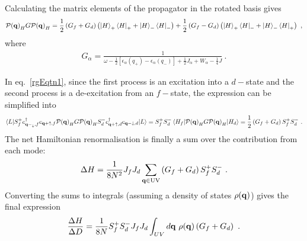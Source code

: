 \documentclass[%
reprint,
superscriptaddress,
groupedaddress,
superscriptaddress,
onecolumn,
10pt
]{revtex4-2}
\begin{document}
Calculating the matrix elements of the propagator in the rotated basis gives
\begin{equation}\begin{aligned}\label{PGP}
	\mathcal{P({\bf q})}_H G \mathcal{P({\bf q})}_H = \frac{1}{2}\left(G_f + G_d\right)\left(\ket{H}_+\bra{H}_+ + \ket{H}_-\bra{H}_-\right) + \frac{1}{2}\left(G_f - G_d\right)\left(\ket{H}_+\bra{H}_- + \ket{H}_-\bra{H}_+\right)~,
\end{aligned}\end{equation}
where
\begin{equation}\begin{aligned}
	G_\alpha = \frac{1}{\omega - \frac{1}{2}\left[\epsilon_\alpha(q_+) - \epsilon_\alpha(q_-)\right] + \frac{1}{2}J_\alpha + W_\alpha - \frac{1}{4}J}~.
\end{aligned}\end{equation}

In eq.~\ref{rgEqtn1}, since the first process is an excitation into a \(d-\)state and the second process is a de-excitation from an \(f-\)state, the expression can be simplified into
\begin{equation}\begin{aligned}\label{rgEqtn2}
	\braket{L | S_f^+ c^\dagger_{{\bf q-}_\downarrow,f}c_{{\bf q+}\uparrow,f} \mathcal{P({\bf q})}_H G \mathcal{P({\bf q})}_H S_d^- c^\dagger_{{\bf q+}\uparrow,d}c_{{\bf q-}\downarrow,d} | L } = S_f^+ S_d^- \braket{H_f | \mathcal{P({\bf q})}_H G \mathcal{P({\bf q})}_H | H_d} = \frac{1}{2}\left(G_f + G_d\right) S_f^+ S_d^-~.
\end{aligned}\end{equation}
The net Hamiltonian renormalisation is finally a sum over the contribution from each mode:
\begin{equation}\begin{aligned}
	\Delta H = \frac{1}{8N^2}J_f J_d \sum_{{\bf q} \in \text{UV}}\left(G_f + G_d\right) S_f^+ S_d^-~.
\end{aligned}\end{equation}
Converting the sums to integrals (assuming a density of states \(\rho({\bf q})\)) gives the final expression
\begin{equation}\begin{aligned}
	\frac{\Delta H}{\Delta D} = \frac{1}{8N} S_f^+ S_d^-J_f J_d \int_{UV} d{\bf q} ~\rho({\bf q}) \left(G_f + G_d\right)~.
\end{aligned}\end{equation}
\end{document}
